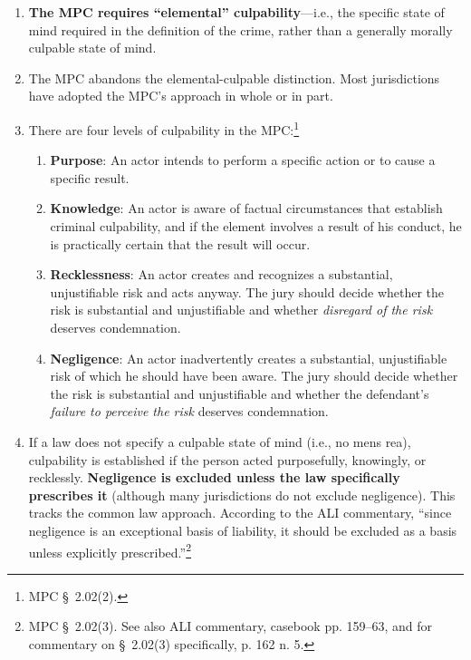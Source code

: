 \begin{enumerate}
    \item \textbf{The MPC requires ``elemental'' culpability}---i.e., the 
    specific state of mind required in the definition of the crime, rather 
    than a generally morally culpable state of mind.
    \item The MPC abandons the elemental-culpable distinction. Most 
    jurisdictions have adopted the MPC's approach in whole or in part.
    \item There are four levels of culpability in the MPC:\footnote{MPC \S\ 
    2.02(2).}
    \begin{enumerate}
        \item \textbf{Purpose}: An actor intends to perform a specific action 
        or to cause a specific result.
        \item \textbf{Knowledge}: An actor is aware of factual circumstances 
        that establish criminal culpability, and if the element involves a 
        result of his conduct, he is practically certain that the result will 
        occur.
        \item \textbf{Recklessness}: An actor creates and recognizes a 
        substantial, unjustifiable risk and acts anyway. The jury should 
        decide whether the risk is substantial and unjustifiable and whether 
        \emph{disregard of the risk} deserves condemnation.
        \item \textbf{Negligence}: An actor inadvertently creates a 
        substantial, unjustifiable risk of which he should have been aware. 
        The jury should decide whether the risk is substantial and 
        unjustifiable and whether the defendant's \emph{failure to perceive 
        the risk} deserves condemnation.
    \end{enumerate}
    \item If a law does not specify a culpable state of mind (i.e., no mens 
    rea), culpability is established if the person acted purposefully, 
    knowingly, or recklessly. \textbf{Negligence is excluded unless the law 
    specifically prescribes it} (although many jurisdictions do not exclude 
    negligence). This tracks the common law approach. According to the ALI 
    commentary, ``since negligence is an exceptional basis of liability, it 
    should be excluded as a basis unless explicitly prescribed.''\footnote{MPC 
    \S\ 2.02(3). See also ALI commentary, casebook pp. 159--63, and for 
    commentary on \S\ 2.02(3) specifically, p. 162 n. 5.}
\end{enumerate}

